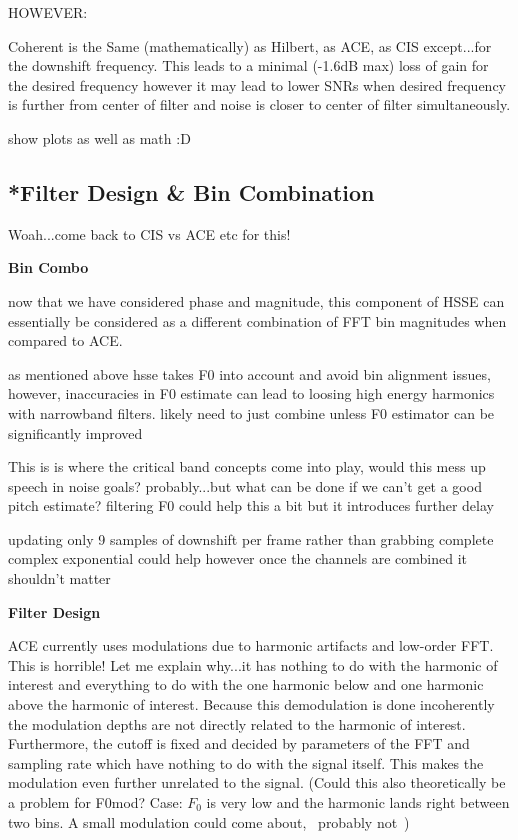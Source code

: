 \documentclass [11pt, proquest] {uwthesis}[2015/03/03]
\begin{document}
HOWEVER:

Coherent is the Same (mathematically) as Hilbert, as ACE, as CIS except...for the downshift frequency.  This leads to a minimal (-1.6dB max) loss of gain for the desired frequency however it may lead to lower SNRs when desired frequency is further from center of filter and noise is closer to center of filter simultaneously.

show plots as well as math :D

\subsection{*Filter Design \& Bin Combination}

Woah...come back to CIS vs ACE etc for this!

\textbf{Bin Combo}

now that we have considered phase and magnitude, this component of HSSE can essentially be considered as a different combination of FFT bin magnitudes when compared to ACE.

as mentioned above hsse takes F0 into account and avoid bin alignment issues, however, inaccuracies in F0 estimate can lead to loosing high energy harmonics with narrowband filters.  likely need to just combine unless F0 estimator can be significantly improved

This is is where the critical band concepts come into play, would this mess up speech in noise goals? probably...but what can be done if we can't get a good pitch estimate?  filtering F0 could help this a bit but it introduces further delay

updating only 9 samples of downshift per frame rather than grabbing complete complex exponential could help however once the channels are combined it shouldn't matter

\textbf{Filter Design}

ACE currently uses modulations due to harmonic artifacts and low-order FFT.  This is horrible!  Let me explain why...it has nothing to do with the harmonic of interest and everything to do with the one harmonic below and one harmonic above the harmonic of interest.  Because this demodulation is done incoherently the modulation depths are not directly related to the harmonic of interest.  Furthermore, the cutoff is fixed and decided by parameters of the FFT and sampling rate which have nothing to do with the signal itself.  This makes the modulation even further unrelated to the signal.  (Could this also theoretically be a problem for F0mod?  Case: $F_0$ is very low and the harmonic lands right between two bins.  A small modulation could come about, ~probably not~)
\end{document}

